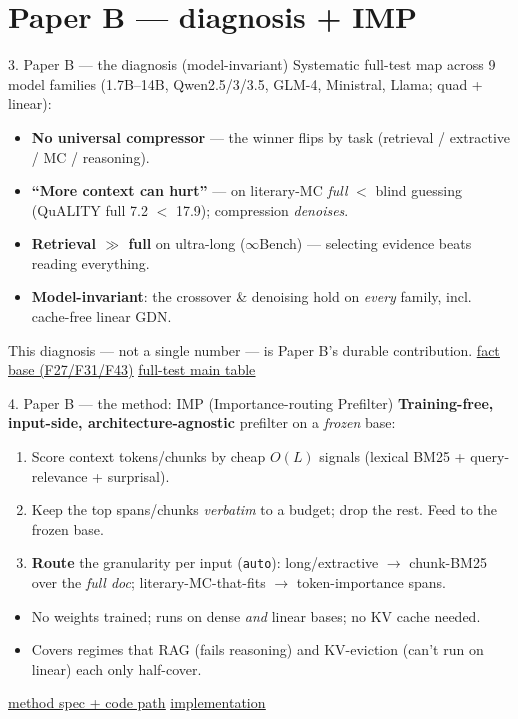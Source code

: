 \documentclass[aspectratio=169]{beamer}
\newcommand{\ghbase}{https://github.com/BDeMo/research-notes/blob/main/notes/plans/08-compressed-context-memory}
\newcommand{\ghB}[2]{\href{\ghbase/papers/paper-b-forgetting-gating/#1}{\color{blue}\underline{#2}}}
\newcommand{\best}[1]{\textbf{#1}}
\begin{document}
\section{Paper B --- diagnosis + IMP}
\begin{frame}{3. Paper B --- the diagnosis (model-invariant)}
  Systematic full-test map across 9 model families (1.7B--14B, Qwen2.5/3/3.5, GLM-4, Ministral, Llama; quad + linear):
  \begin{itemize}
    \item \best{No universal compressor} --- the winner flips by task (retrieval / extractive / MC / reasoning).
    \item \best{``More context can hurt''} --- on literary-MC \emph{full} $<$ blind guessing (QuALITY full 7.2 $<$ 17.9); compression \emph{denoises}.
    \item \best{Retrieval $\gg$ full} on ultra-long ($\infty$Bench) --- selecting evidence beats reading everything.
    \item \best{Model-invariant}: the crossover \& denoising hold on \emph{every} family, incl. cache-free linear GDN.
  \end{itemize}
  \begin{block}{}
  \footnotesize This diagnosis --- not a single number --- is Paper B's durable contribution.
  \ghB{matrix-facts.md}{fact base (F27/F31/F43)} \; \ghB{main-table-fulltest.md}{full-test main table}
  \end{block}
\end{frame}

\begin{frame}{4. Paper B --- the method: IMP (Importance-routing Prefilter)}
  \textbf{Training-free, input-side, architecture-agnostic} prefilter on a \emph{frozen} base:
  \begin{enumerate}\small
    \item Score context tokens/chunks by cheap $O(L)$ signals (lexical BM25 + query-relevance + surprisal).
    \item Keep the top spans/chunks \emph{verbatim} to a budget; drop the rest. Feed to the frozen base.
    \item \best{Route} the granularity per input (\texttt{auto}): long/extractive $\to$ chunk-BM25 over the \emph{full doc}; literary-MC-that-fits $\to$ token-importance spans.
  \end{enumerate}
  \begin{itemize}\small
    \item No weights trained; runs on dense \emph{and} linear bases; no KV cache needed.
    \item Covers regimes that RAG (fails reasoning) and KV-eviction (can't run on linear) each only half-cover.
  \end{itemize}
  \begin{block}{}
  \footnotesize \ghB{method-vNext-2026-07-13.md}{method spec + code path} \; \ghB{imp-method-and-implementation.md}{implementation}
  \end{block}
\end{frame}
\end{document}
